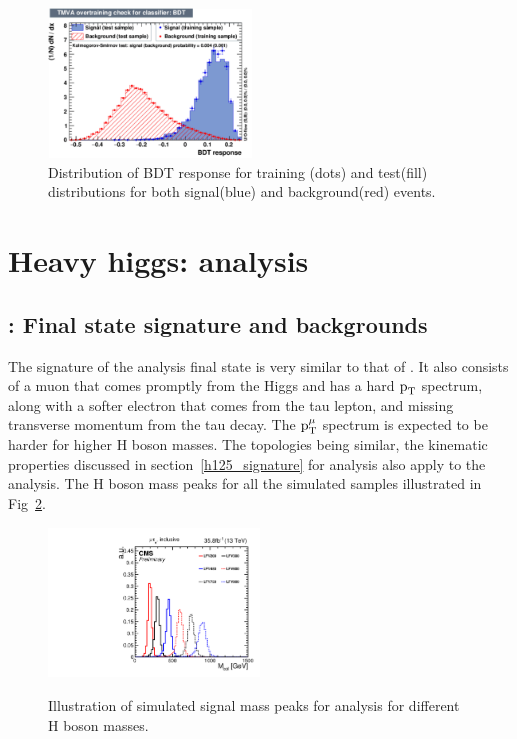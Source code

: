 \begin{figure}[htpb]
\begin{center}
\includegraphics[width=0.48\textwidth]{plots_and_figures/chapter5/overtrain_BDT.pdf}
\end{center}
\caption{Distribution of BDT response for training (dots) and test(fill) distributions for both signal(blue) and background(red) events.}
\label{fig:BDT_response}
\end{figure}

\section{ Heavy higgs: \Hmue analysis}
\subsection{\Hmue: Final state signature and backgrounds}
\label{HH_evt_sel}

The signature of the \Hmue analysis final state is very similar to that of \hmue. It also consists of a muon that comes promptly from the Higgs and has a hard $\text{p}_\text{T}$ spectrum, along with a softer electron that comes from the tau lepton, and missing transverse momentum from the tau decay. The $\text{p}_\text{T}^{\mu}$ spectrum is expected to be harder for higher H boson masses. The topologies being similar, the kinematic properties discussed in section~\ref{h125_signature} for \hmue analysis also apply to the \Hmue analysis. The H boson mass peaks for all the simulated samples illustrated in Fig~\ref{fig:sig_peaks}.


\begin{figure}[htbp]
     \centering
     \includegraphics[width=0.5\textwidth]{plots_and_figures/chapter5/HM_signals_only_colmass.pdf}\\
     \caption{Illustration of simulated signal mass peaks for \Hmue analysis for different H boson masses.}
     \label{fig:sig_peaks}
\end{figure}

